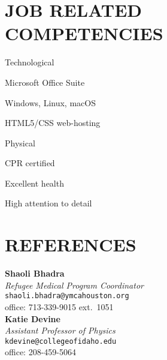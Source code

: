 \documentclass[margin]{res}
\newcommand\reference[5]{\textbf{#1}\\\emph{#2}\\#5\\#3\\}
\begin{document}
\begin{resume}
\section{JOB RELATED COMPETENCIES}\vspace{0pt}
	\begin{multicols}{2}
		\parskip=0pt
		\begin{skill}{Technological}
			\item Microsoft Office Suite
			\item Windows, Linux, macOS
			\item HTML5/CSS web-hosting
		\end{skill}
		\begin{skill}{Physical}
			\item CPR certified
			\item Excellent health
			\item High attention to detail
		\end{skill}
	\end{multicols}

% 
\section{REFERENCES} \vspace{0pt}
	\begin{multicols}{2}
		\parskip=0pt
		\reference{Shaoli Bhadra}{Refugee Medical Program Coordinator}{office: 713-339-9015 ext.\ 1051}{cell: 704-651-3610}{\texttt{shaoli.bhadra@ymcahouston.org}}
		
		\reference{Katie Devine}{Assistant Professor of Physics}{office: 208-459-5064}{cell: 507-261-9310}{\texttt{kdevine@collegeofidaho.edu}}
	\end{multicols}



\end{resume}
\end{document}
